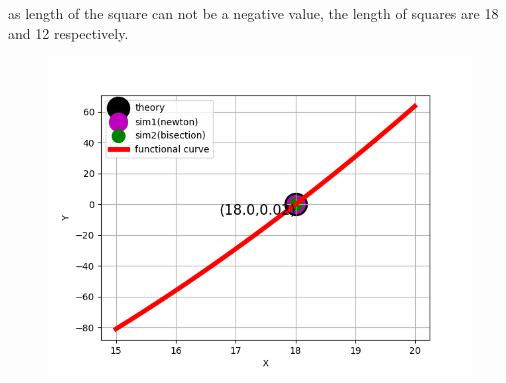\documentclass[journal]{IEEEtran}
\begin{document}
as length of the square can not be a negative value,
the length of squares are 18 and 12 respectively.
\begin{figure}[h!]
   \centering
   \includegraphics[width=1\columnwidth]{figures/Figure_1.png}
   \label{graph of the function}
\end{figure}
\end{document}
